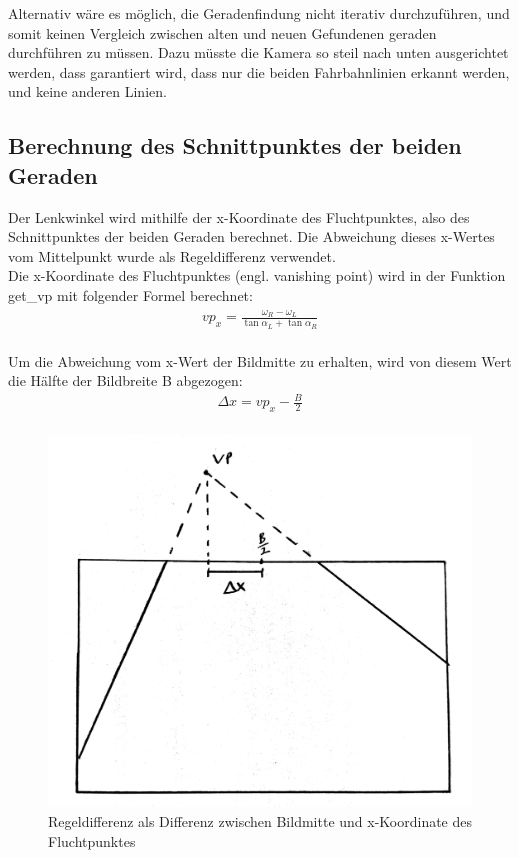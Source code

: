 	Alternativ wäre es möglich, die Geradenfindung nicht iterativ durchzuführen, und somit keinen Vergleich zwischen alten und neuen Gefundenen geraden durchführen zu müssen. Dazu müsste die Kamera so steil nach unten ausgerichtet werden, dass garantiert wird, dass nur die beiden Fahrbahnlinien erkannt werden, und keine anderen Linien.


	\subsection{Berechnung des Schnittpunktes der beiden Geraden}
	
	Der Lenkwinkel wird mithilfe der x-Koordinate des Fluchtpunktes, also des Schnittpunktes der beiden Geraden berechnet. Die Abweichung dieses x-Wertes vom Mittelpunkt wurde als Regeldifferenz verwendet.\\
	Die x-Koordinate des Fluchtpunktes (engl. vanishing point) wird in der Funktion get\_vp mit folgender Formel berechnet:\\
	
	\begin{align*}
	vp_x=\frac{\omega_R-\omega_L}{\tan{\alpha_L}+\tan{\alpha_R}} \\
	\end{align*}
	
	Um die Abweichung vom x-Wert der Bildmitte zu erhalten, wird von diesem Wert die Hälfte der Bildbreite B abgezogen:\\
	
	\begin{align*}
	\Delta x=vp_x-\frac{B}{2} \\
	\end{align*}
	
	
	\begin{figure}[H]
		\centering
		\includegraphics[width=.5\linewidth]{images/vp.jpg}
		\caption{Regeldifferenz als Differenz zwischen Bildmitte und x-Koordinate des Fluchtpunktes}
		\label{fig:alpha_omega3}
	\end{figure}

